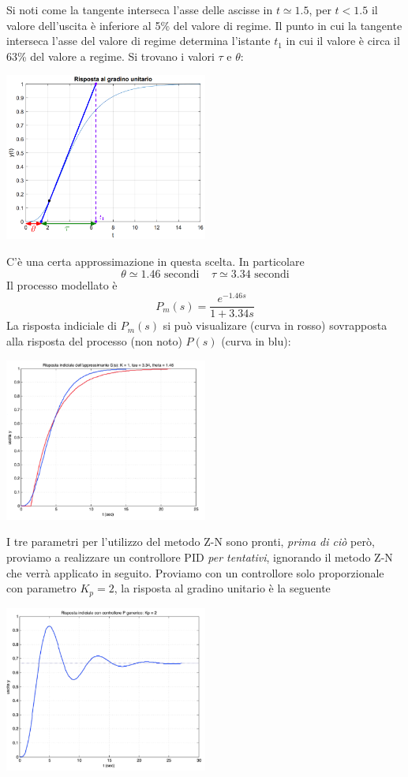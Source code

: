 \documentclass[10pt, letterpaper]{report}
\begin{document}
Si noti come la tangente interseca l'asse delle ascisse in $t\simeq 1.5$, per $t< 1.5$ il valore dell'uscita è inferiore al 5\% del valore di regime. Il punto in cui la tangente interseca l'asse del valore di regime determina l'istante $t_1$ in cui il valore è circa il 63\% del valore a regime. Si trovano i valori $\tau$ e $\theta$:
\begin{center}
    \includegraphics[width=0.5\textwidth]{images/ZN4.eps}
\end{center}
C'è una certa approssimazione in questa scelta. In particolare
$$ \theta \simeq 1.46 \text{ secondi} \ \ \ \ \ \tau \simeq  3.34 \text{ secondi}$$
Il processo modellato è 
$$ P_m(s)=\frac{e^{-1.46s}}{1+3.34 s}$$
La risposta indiciale di $P_m(s)$ si può visualizare (curva in rosso) sovrapposta alla risposta del processo (non noto) $P(s)$ (curva in blu):
\begin{center}
    \includegraphics[width=0.5\textwidth]{images/ZN5.png}
\end{center}
I tre parametri per l'utilizzo del metodo Z-N sono pronti, \textit{prima di ciò} però, proviamo a realizzare un controllore PID \textit{per tentativi}, ignorando il metodo Z-N che verrà applicato in seguito. \acc 
Proviamo con un controllore solo proporzionale con parametro $K_p=2$, la risposta al gradino unitario è la seguente
\begin{center}
    \includegraphics[width=0.5\textwidth]{images/tentativi.png}
\end{center}
\end{document}
